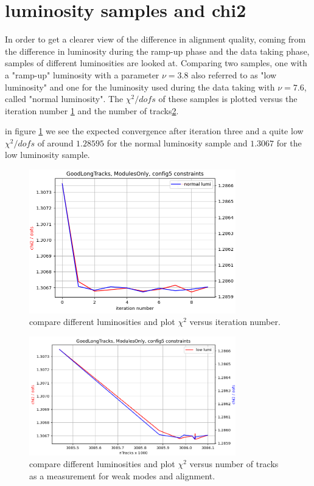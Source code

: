 \section{luminosity samples and chi2}
In order to get a clearer view of the difference in alignment quality, coming from the difference in luminosity during the ramp-up phase and the data taking phase, samples of different luminosities are looked at.
Comparing two samples, one with a "ramp-up" luminosity with a parameter $\nu = 3.8$ also referred to as "low luminosity" and one for the luminosity used during the data taking
with $\nu = 7.6$, called "normal luminosity".
The $\chi^2 / dofs$ of these samples is plotted versus the iteration number \ref{fig:chi2iter_lumi_normal} and the number of tracks\ref{fig:chi2tracks_lumi_normal}.

in figure \ref{fig:chi2iter_lumi_normal} we see the expected convergence after iteration three and a quite low $\chi^2 / dofs$ of around $\num{1.28595}$ for the normal luminosity sample
and $\num{1.3067}$ for the low luminosity sample.

\begin{figure}
  \centering
  \includegraphics[width=0.8\textwidth]{plots/renewed_plots/modules_chi2_c5.png}
  \caption{compare different luminosities and plot $\chi^2$ versus iteration number.}
  \label{fig:chi2iter_lumi_normal}
\end{figure}

\begin{figure}
  \centering
  \includegraphics[width=0.8\textwidth]{plots/jan_17_2022/chi2_tracks_modulesOnly.png}
  \caption{compare different luminosities and plot $\chi^2$ versus number of tracks as a measurement for weak modes and alignment.}
  \label{fig:chi2tracks_lumi_normal}
\end{figure}

